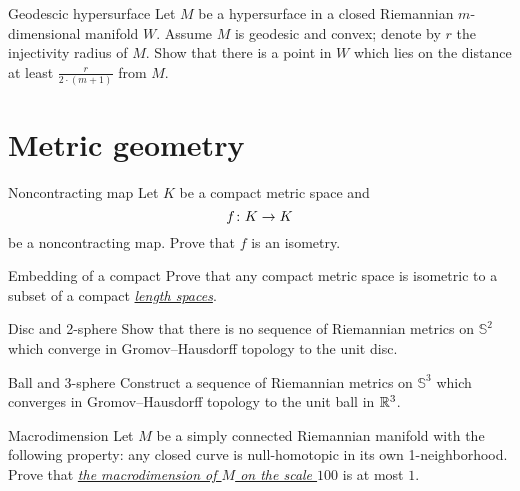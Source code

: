 \documentclass[twoside]{book}
\begin{document}
\begin{pr}{\easy}{Geodescic hypersurface}\label{Geodescic hypersurface}
Let $M$ be a hypersurface 
in a closed Riemannian $m$-dimensional manifold $W$.
Assume $M$ is geodesic and convex;
denote by $r$ the injectivity radius of $M$.
Show that there is a point in $W$  which lies on the distance at least  
$\frac{r}{2\cdot(m+1)}$ from $M$.
\end{pr}



\chapter{Metric geometry}


\begin{pr}{\easy}{Noncontracting map}\label{Noncontracting map}
Let $K$  be a compact metric space and
\[f\:K\z\to K\] 
be a noncontracting map.
Prove that $f$ is an isometry.
\end{pr}


\begin{pr}{\thm}{Embedding of a compact}\label{compact} Prove that any compact metric space is isometric to a subset of a compact \hyperref[Length space]{\emph{length spaces}}.
\end{pr}



\begin{pr}{}{Disc and 2-sphere}\label{2-sphere is far from a ball}
Show that there is no sequence of Riemannian metrics on
$\mathbb{S}^2$ which converge in Gromov--Hausdorff topology to the unit disc.
\end{pr}


\begin{pr}{}{Ball and 3-sphere}\label{3-sphere is close to a ball}
Construct a sequence of Riemannian metrics on $\mathbb{S}^3$ 
which converges in Gromov--Hausdorff topology 
to the unit ball in $\mathbb{R}^3$.
\end{pr}

\begin{pr}{\easy}{Macrodimension}\label{macrodimension} 
Let $M$ be a simply connected Riemannian manifold with the following property: 
any closed curve is null-homotopic 
in its own  1-neighborhood. 
Prove that \hyperref[Macrodimension]{\emph{the macrodimension of $M$ on the scale $100$}} is at most $1$.
\end{pr}
\end{document}
